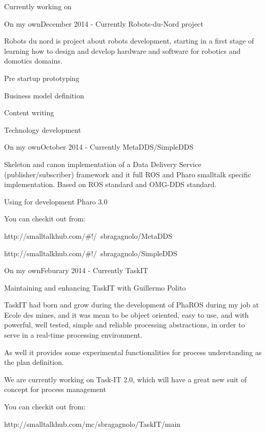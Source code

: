 \documentclass{resume} %
\begin{document}
\begin{rSection}{Currently working on}

	\begin{rSubsection}{On my own}{December 2014 - Currently }{Robots-du-Nord project}
		\item Robots du nord is project about robots development, starting in a first stage of learning how to design and develop hardware and software for robotics and domotics domains.
		\item Pre startup prototyping
		\item Business model definition
		\item Content writing
		\item Technology development
	\end{rSubsection}
	
	\begin{rSubsection}{On my own}{October 2014 - Currently }{MetaDDS/SimpleDDS}
		\item Skeleton and canon implementation of a Data Delivery Service (publisher/subscriber) framework and it full ROS and Pharo smalltalk specific implementation. Based on ROS standard and OMG-DDS standard.
		\item Using for development Pharo 3.0
		\item You can checkit out from: 
		\item http://smalltalkhub.com/\#!/~sbragagnolo/MetaDDS
		\item http://smalltalkhub.com/\#!/~sbragagnolo/SimpleDDS
	\end{rSubsection}

	\begin{rSubsection}{On my own}{Feburary 2014 - Currently }{TaskIT}
		\item Maintaining and enhancing TaskIT with Guillermo Polito
		\item TaskIT had born and grow during the development of PhaROS during my job at Ecole des mines, and it was mean to be object oriented, easy to use, and with powerful, well tested, simple and reliable processing abstractions, in order to serve in a real-time processing environment. 
		\item As well it provides some experimental functionalities for process understanding as the plan definition. 
		\item We are currently working on Task-IT 2.0, which will have a great new suit of concept for process management
		\item You can checkit out from:
		\item http://smalltalkhub.com/mc/sbragagnolo/TaskIT/main
	\end{rSubsection}

\end{rSection}
\end{document}
